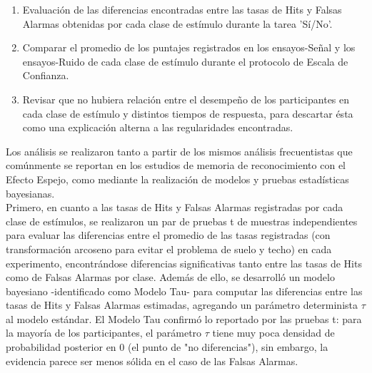\begin{enumerate}
	\item Evaluación de las diferencias encontradas entre las tasas de Hits y Falsas Alarmas obtenidas por cada clase de estímulo durante la tarea 'Sí/No'.\\
	\item Comparar el promedio de los puntajes registrados en los ensayos-Señal y los ensayos-Ruido de cada clase de estímulo durante el protocolo de Escala de Confianza.\\
	\item Revisar que no hubiera relación entre el desempeño de los participantes en cada clase de estímulo y distintos tiempos de respuesta, para descartar ésta como una explicación alterna a las regularidades encontradas.\\
\end{enumerate}

Los análisis se realizaron tanto a partir de los mismos análisis frecuentistas que comúnmente se reportan en los estudios de memoria de reconocimiento con el Efecto Espejo, como mediante la realización de modelos y pruebas estadísticas bayesianas.\\

Primero, en cuanto a las tasas de Hits y Falsas Alarmas registradas por cada clase de estímulos, se realizaron un par de pruebas t de muestras independientes para evaluar las diferencias entre el promedio de las tasas registradas (con transformación arcoseno para evitar el problema de suelo y techo) en cada experimento, encontrándose diferencias significativas tanto entre las tasas de Hits como de Falsas Alarmas por clase. Además de ello, se desarrolló un modelo bayesiano -identificado como Modelo Tau- para computar las diferencias entre las tasas de Hits y Falsas Alarmas estimadas, agregando un parámetro determinista $\tau$ al modelo estándar. El Modelo Tau confirmó lo reportado por las pruebas t: para la mayoría de los participantes, el parámetro $\tau$ tiene muy poca densidad de probabilidad posterior en $0$ (el punto de "no diferencias"), sin embargo, la evidencia parece ser menos sólida en el caso de las Falsas Alarmas. \\ %

